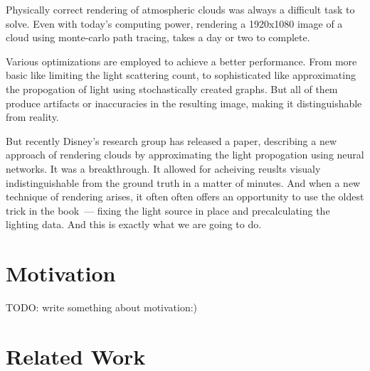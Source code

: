 \documentclass[times,specification,annotation]{itmo-student-thesis}
\begin{document}




\tableofcontents

\startprefacepage

Physically correct rendering of atmospheric clouds was always a difficult task to solve. Even with today's computing power, rendering a 1920x1080 image of a cloud using monte-carlo path tracing, takes a day or two to complete. 

Various optimizations are employed to achieve a better performance. From more basic like limiting the light scattering count, to sophisticated like approximating the propogation of light using stochastically created graphs. But all of them produce artifacts or inaccuracies in the resulting image, making it distinguishable from reality.

But recently Disney's research group has released a paper, describing a new approach of rendering clouds by approximating the light propogation using neural networks. It was a breakthrough. It allowed for acheiving reuslts visualy indistinguishable from the ground truth in a matter of minutes. And when a new technique of rendering arises, it often often offers an opportunity to use the oldest trick in the book~--- fixing the light source in place and precalculating the lighting data. And this is exactly what we are going to do.


\chapter{Motivation}
TODO: write something about motivation:)

\chapter{Related Work}
\end{document}
